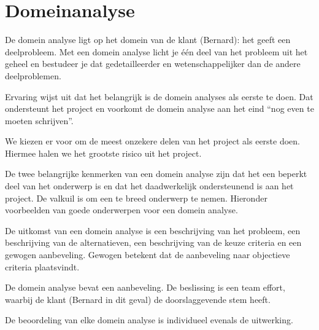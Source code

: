 
\section{Domeinanalyse}

De domein analyse ligt op het domein van de klant (Bernard): het geeft een deelprobleem. Met een domein analyse licht je
\'e\'en deel van het probleem uit het geheel en bestudeer je dat gedetailleerder en wetenschappelijker dan de andere deelproblemen.

Ervaring wijst uit dat het belangrijk is de domein analyses als eerste te doen. Dat ondersteunt het project en voorkomt
de domein analyse aan het eind ``nog even te moeten schrijven''.

We kiezen er voor om de meest onzekere delen van het project als eerste doen. Hiermee halen we het grootste risico uit het
project.

De twee belangrijke kenmerken van een domein analyse zijn dat het een beperkt deel van het onderwerp is en dat het daadwerkelijk
ondersteunend is aan het project. De valkuil is om een te breed onderwerp te nemen. Hieronder voorbeelden van goede onderwerpen
voor een domein analyse.

De uitkomst van een domein analyse is een beschrijving van het probleem,
een beschrijving van de alternatieven, een beschrijving van de keuze criteria en een gewogen aanbeveling. Gewogen betekent dat de aanbeveling naar objectieve criteria plaatsvindt.

De domein analyse bevat een aanbeveling. De beslissing is een team effort, waarbij de klant (Bernard in dit geval) de doorslaggevende stem heeft.

De beoordeling van elke domein analyse is individueel evenals de uitwerking.

